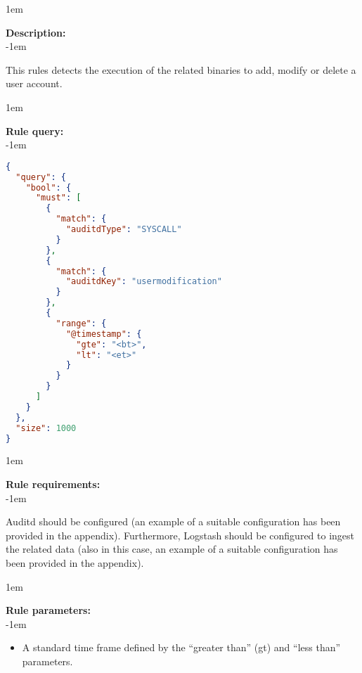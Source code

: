 \openup 1em

{\bf Description:} \\

\openup -1em
\vspace{-2em}


This rules detects the execution of the related binaries to add, modify or delete a user account.

\openup 1em

{\bf Rule query:} \\

\openup -1em
\vspace{-2em}

\begin{lstlisting}[language=json,firstnumber=1]
{
  "query": {
    "bool": {
      "must": [
        {
          "match": {
            "auditdType": "SYSCALL"
          }
        },
        {
          "match": {
            "auditdKey": "usermodification"
          }
        },
        {
          "range": {
            "@timestamp": {
              "gte": "<bt>",
              "lt": "<et>"
            }
          }
        }
      ]
    }
  },
  "size": 1000
}
\end{lstlisting}

\openup 1em

{\bf Rule requirements:} \\

\openup -1em
\vspace{-2em}

Auditd should be configured (an example of a suitable configuration has been provided in the appendix). Furthermore, Logstash should be configured to ingest the related data (also in this case, an example of a suitable configuration has been provided in the appendix).

\openup 1em

{\bf Rule parameters:} \\

\openup -1em
\vspace{-2em}

\begin{itemize}
	\item A standard time frame defined by the ``greater than'' (gt) and ``less than'' parameters.
\end{itemize}

